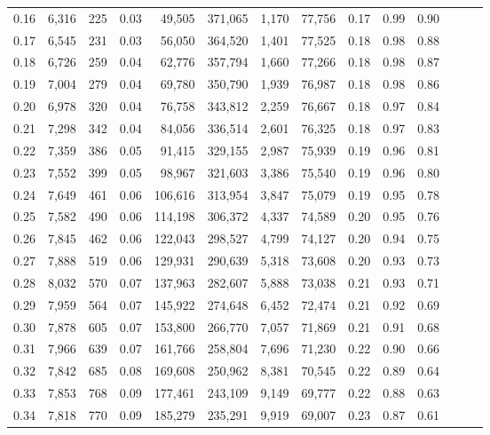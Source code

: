 \begin{tabular}{rrrrrrrrrrrrrr}
0.16 &  6,316 &    225 &  0.03 &   49,505 &  371,065 &   1,170 &  77,756 &  0.17 &  0.99 &      0.90 \\
0.17 &  6,545 &    231 &  0.03 &   56,050 &  364,520 &   1,401 &  77,525 &  0.18 &  0.98 &      0.88 \\
0.18 &  6,726 &    259 &  0.04 &   62,776 &  357,794 &   1,660 &  77,266 &  0.18 &  0.98 &      0.87 \\
0.19 &  7,004 &    279 &  0.04 &   69,780 &  350,790 &   1,939 &  76,987 &  0.18 &  0.98 &      0.86 \\
0.20 &  6,978 &    320 &  0.04 &   76,758 &  343,812 &   2,259 &  76,667 &  0.18 &  0.97 &      0.84 \\
0.21 &  7,298 &    342 &  0.04 &   84,056 &  336,514 &   2,601 &  76,325 &  0.18 &  0.97 &      0.83 \\
0.22 &  7,359 &    386 &  0.05 &   91,415 &  329,155 &   2,987 &  75,939 &  0.19 &  0.96 &      0.81 \\
0.23 &  7,552 &    399 &  0.05 &   98,967 &  321,603 &   3,386 &  75,540 &  0.19 &  0.96 &      0.80 \\
0.24 &  7,649 &    461 &  0.06 &  106,616 &  313,954 &   3,847 &  75,079 &  0.19 &  0.95 &      0.78 \\
0.25 &  7,582 &    490 &  0.06 &  114,198 &  306,372 &   4,337 &  74,589 &  0.20 &  0.95 &      0.76 \\
0.26 &  7,845 &    462 &  0.06 &  122,043 &  298,527 &   4,799 &  74,127 &  0.20 &  0.94 &      0.75 \\
0.27 &  7,888 &    519 &  0.06 &  129,931 &  290,639 &   5,318 &  73,608 &  0.20 &  0.93 &      0.73 \\
0.28 &  8,032 &    570 &  0.07 &  137,963 &  282,607 &   5,888 &  73,038 &  0.21 &  0.93 &      0.71 \\
0.29 &  7,959 &    564 &  0.07 &  145,922 &  274,648 &   6,452 &  72,474 &  0.21 &  0.92 &      0.69 \\
0.30 &  7,878 &    605 &  0.07 &  153,800 &  266,770 &   7,057 &  71,869 &  0.21 &  0.91 &      0.68 \\
0.31 &  7,966 &    639 &  0.07 &  161,766 &  258,804 &   7,696 &  71,230 &  0.22 &  0.90 &      0.66 \\
0.32 &  7,842 &    685 &  0.08 &  169,608 &  250,962 &   8,381 &  70,545 &  0.22 &  0.89 &      0.64 \\
0.33 &  7,853 &    768 &  0.09 &  177,461 &  243,109 &   9,149 &  69,777 &  0.22 &  0.88 &      0.63 \\
0.34 &  7,818 &    770 &  0.09 &  185,279 &  235,291 &   9,919 &  69,007 &  0.23 &  0.87 &      0.61 \\

\end{tabular}
